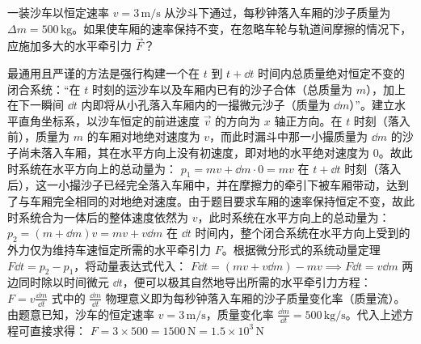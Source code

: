 \begin{example}
一装沙车以恒定速率 $v = 3\,\mathrm{m/s}$ 从沙斗下通过，每秒钟落入车厢的沙子质量为 $\Delta m = 500\,\mathrm{kg}$。如果使车厢的速率保持不变，在忽略车轮与轨道间摩擦的情况下，应施加多大的水平牵引力 $\vec{F}$？
\end{example}
\begin{solution}
最通用且严谨的方法是强行构建一个在 $t$ 到 $t+\dd t$ 时间内总质量绝对恒定不变的闭合系统：“在 $t$ 时刻的运沙车以及车厢内已有的沙子合体（总质量为 $m$），加上在下一瞬间 $\dd t$ 内即将从小孔落入车厢内的一撮微元沙子（质量为 $\dd m$）”。建立水平直角坐标系，以沙车恒定的前进速度 $\vec{v}$ 的方向为 $x$ 轴正方向。在 $t$ 时刻（落入前），质量为 $m$ 的车厢对地绝对速度为 $v$，而此时漏斗中那一小撮质量为 $\dd m$ 的沙子尚未落入车厢，其在水平方向上没有初速度，即对地的水平绝对速度为 $0$。故此时系统在水平方向上的总动量为：
 \(p_1 = mv + \dd m \cdot 0 = mv\) 
在 $t+\dd t$ 时刻（落入后），这一小撮沙子已经完全落入车厢中，并在摩擦力的牵引下被车厢带动，达到了与车厢完全相同的对地绝对速度。由于题目要求车厢的速率保持恒定不变，故此时系统合为一体后的整体速度依然为 $v$，此时系统在水平方向上的总动量为：
 \(p_2 = (m + \dd m)v = mv + v\dd m\) 
在 $\dd t$ 时间内，整个闭合系统在水平方向上受到的外力仅为维持车速恒定所需的水平牵引力 $F$。根据微分形式的系统动量定理 $F\dd t = p_2 - p_1$，将动量表达式代入：
 \(F\dd t = (mv + v\dd m) - mv \implies F\dd t = v\dd m\) 
两边同时除以时间微元 $\dd t$，便可以极其自然地导出所需的水平牵引力方程：
 \(F = v\frac{\dd m}{\dd t}\) 
式中的 $\frac{\dd m}{\dd t}$ 物理意义即为每秒钟落入车厢的沙子质量变化率（质量流）。由题意已知，沙车的恒定速率 $v = 3\,\mathrm{m/s}$，质量变化率 $\frac{\dd m}{\dd t} = 500\,\mathrm{kg/s}$。代入上述方程可直接求得：
 \(F = 3 \times 500 = 1500\,\mathrm{N} = 1.5 \times 10^3\,\mathrm{N}\) 
\end{solution}

